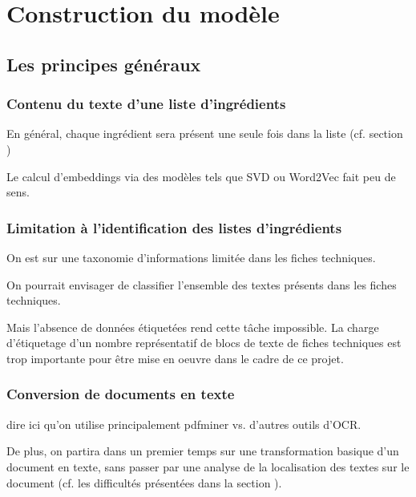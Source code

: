 \part{Construction du modèle}
    \chapter{Les principes généraux}
        \section{Contenu du texte d'une liste d'ingrédients}

        En général, chaque ingrédient sera présent une seule fois dans la liste (cf. section )

        Le calcul d'embeddings via des modèles tels que SVD ou Word2Vec fait peu de sens.
        \newline
        \newline

        \section{Limitation à l'identification des listes d'ingrédients}

        On est sur une taxonomie d'informations limitée dans les fiches techniques.

        On pourrait envisager de classifier l'ensemble des textes présents dans les fiches techniques.

        Mais l'absence de données étiquetées rend cette tâche impossible. La charge d'étiquetage d'un nombre représentatif de blocs de texte de fiches techniques est trop importante pour être mise en oeuvre dans le cadre de ce projet.

        \section{Conversion de documents en texte}
        
        dire ici qu'on utilise principalement pdfminer vs. d'autres outils d'OCR.

        De plus, on partira dans un premier temps sur une transformation basique d'un document en texte, sans passer par une analyse de la localisation des textes sur le document (cf. les difficultés présentées dans la section ).
            
